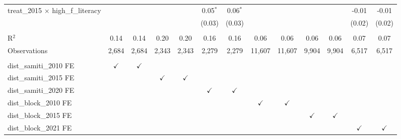 \begin{adjustbox}{max width=\linewidth}
\begin{threeparttable}[b]
\begin{tabular}{lcccccccccccc}
         treat\_2015 $\times$ high\_f\_literacy     &               &               &               &               & 0.05$^{*}$    & 0.06$^{*}$    &               &               &               &               & -0.01         & -0.01\\   
                                                    &               &               &               &               & (0.03)        & (0.03)        &               &               &               &               & (0.02)        & (0.02)\\   
          \\
         R$^2$                                      & 0.14          & 0.14          & 0.20          & 0.20          & 0.16          & 0.16          & 0.06          & 0.06          & 0.06          & 0.06          & 0.07          & 0.07\\  
         Observations                               & 2,684         & 2,684         & 2,343         & 2,343         & 2,279         & 2,279         & 11,607        & 11,607        & 9,904         & 9,904         & 6,517         & 6,517\\  
          \\
         dist\_samiti\_2010 FE                      & $\checkmark$  & $\checkmark$  &               &               &               &               &               &               &               &               &               & \\  
         dist\_samiti\_2015 FE                      &               &               & $\checkmark$  & $\checkmark$  &               &               &               &               &               &               &               & \\  
         dist\_samiti\_2020 FE                      &               &               &               &               & $\checkmark$  & $\checkmark$  &               &               &               &               &               & \\  
         dist\_block\_2010 FE                       &               &               &               &               &               &               & $\checkmark$  & $\checkmark$  &               &               &               & \\  
         dist\_block\_2015 FE                       &               &               &               &               &               &               &               &               & $\checkmark$  & $\checkmark$  &               & \\  
         dist\_block\_2021 FE                       &               &               &               &               &               &               &               &               &               &               & $\checkmark$  & $\checkmark$\\   
         \bottomrule
      \end{tabular}
      

\end{threeparttable}
\end{adjustbox}
